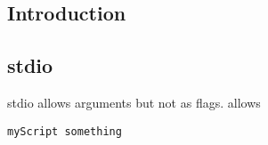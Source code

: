 
\subsection{Introduction}

\subsection{stdio}

stdio allows arguments but not as flags. 
allows
\begin{verbatim}
myScript something
\end{verbatim}



